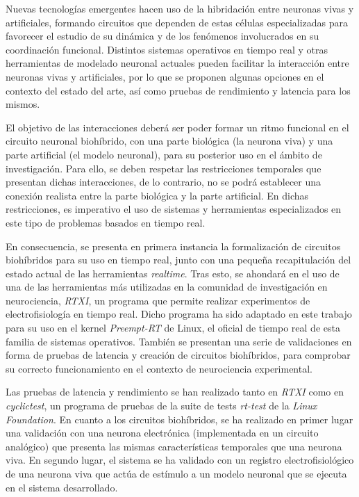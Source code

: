Nuevas tecnologías emergentes hacen uso de la hibridación entre neuronas vivas y artificiales, formando circuitos que dependen de estas células especializadas para favorecer el estudio de su dinámica y de los fenómenos involucrados en su coordinación funcional. Distintos sistemas operativos en tiempo real y otras herramientas de modelado neuronal actuales pueden facilitar la interacción entre neuronas vivas y artificiales, por lo que se proponen algunas opciones en el contexto del estado del arte, así como pruebas de rendimiento y latencia para los mismos.

El objetivo de las interacciones deberá ser poder formar un ritmo funcional en el circuito neuronal biohíbrido, con una parte biológica (la neurona viva) y una parte artificial (el modelo neuronal), para su posterior uso en el ámbito de investigación. Para ello, se deben respetar las restricciones temporales que presentan dichas interacciones, de lo contrario, no se podrá establecer una conexión realista entre la parte biológica y la parte artificial. En dichas restricciones, es imperativo el uso de sistemas y herramientas especializados en este tipo de problemas basados en tiempo real.

En consecuencia, se presenta en primera instancia la formalización de circuitos biohíbridos para su uso en tiempo real, junto con una pequeña recapitulación del estado actual de las herramientas \textit{realtime}. Tras esto, se ahondará en el uso de una de las herramientas más utilizadas en la comunidad de investigación en neurociencia, \textit{RTXI}, un programa que permite realizar experimentos de electrofisiología en tiempo real. Dicho programa ha sido adaptado en este trabajo para su uso en el kernel \textit{Preempt-RT} de Linux, el oficial de tiempo real de esta familia de sistemas operativos. También se presentan una serie de validaciones en forma de pruebas de latencia y creación de circuitos biohíbridos, para comprobar su correcto funcionamiento en el contexto de neurociencia experimental.

Las pruebas de latencia y rendimiento se han realizado tanto en \textit{RTXI} como en \textit{cyclictest}, un programa de pruebas de la suite de tests \textit{rt-test} de la \textit{Linux Foundation}. En cuanto a los circuitos biohíbridos, se ha realizado en primer lugar una validación con una neurona electrónica (implementada en un circuito analógico) que presenta las mismas características temporales que una neurona viva. En segundo lugar, el sistema se ha validado con un registro electrofisiológico de una neurona viva que actúa de estímulo a un modelo neuronal que se ejecuta en el sistema desarrollado.


